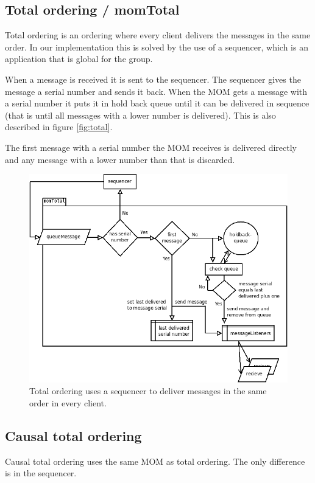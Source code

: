 \documentclass[english]{article}
\begin{document}
\subsection{Total ordering / momTotal}
\label{mo-total}
Total ordering is an ordering where every client delivers the messages in the same order. In our implementation this is solved by the use of a sequencer, which is an application that is global for the group. 

When a message is received it is sent to the sequencer. The sequencer gives the message a serial number and sends it back. When the MOM gets a message with a serial number it puts it in hold back queue until it can be delivered in sequence (that is until all messages with a lower number is delivered). This is also described in figure \vref{fig:total}.

The first message with a serial number the MOM receives is delivered directly and any message with a lower number than that is discarded.

\begin{figure}
\includegraphics[width=\textwidth]{momTotal.png}
\caption{Total ordering uses a sequencer to deliver messages in the same order in every client.}
\label{fig:total}
\end{figure}

\subsection{Causal total ordering}
Causal total ordering uses the same MOM as total ordering. The only difference is in the sequencer.
\end{document}
